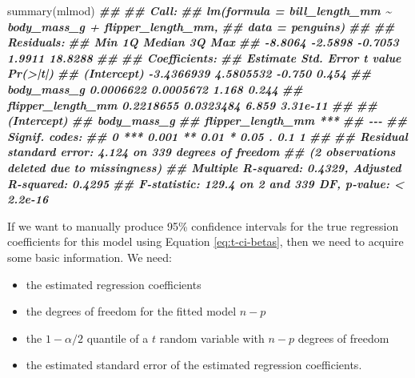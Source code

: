 \documentclass[
]{book}
\newenvironment{Shaded}{\begin{snugshade}}{\end{snugshade}}
\newcommand{\DocumentationTok}[1]{\textcolor[rgb]{0.56,0.35,0.01}{\textbf{\textit{#1}}}}
\newcommand{\FunctionTok}[1]{\textcolor[rgb]{0.00,0.00,0.00}{#1}}
\newcommand{\NormalTok}[1]{#1}
\providecommand{\tightlist}{%
  \setlength{\itemsep}{0pt}\setlength{\parskip}{0pt}}
\theoremstyle{definition}
\theoremstyle{definition}
\theoremstyle{definition}
\theoremstyle{definition}
\theoremstyle{remark}
\begin{document}
\begin{Shaded}
\begin{Highlighting}[]
\FunctionTok{summary}\NormalTok{(mlmod)}
\DocumentationTok{\#\# }
\DocumentationTok{\#\# Call:}
\DocumentationTok{\#\# lm(formula = bill\_length\_mm \textasciitilde{} body\_mass\_g + flipper\_length\_mm, }
\DocumentationTok{\#\#     data = penguins)}
\DocumentationTok{\#\# }
\DocumentationTok{\#\# Residuals:}
\DocumentationTok{\#\#     Min      1Q  Median      3Q     Max }
\DocumentationTok{\#\# {-}8.8064 {-}2.5898 {-}0.7053  1.9911 18.8288 }
\DocumentationTok{\#\# }
\DocumentationTok{\#\# Coefficients:}
\DocumentationTok{\#\#                     Estimate Std. Error t value Pr(\textgreater{}|t|)}
\DocumentationTok{\#\# (Intercept)       {-}3.4366939  4.5805532  {-}0.750    0.454}
\DocumentationTok{\#\# body\_mass\_g        0.0006622  0.0005672   1.168    0.244}
\DocumentationTok{\#\# flipper\_length\_mm  0.2218655  0.0323484   6.859 3.31e{-}11}
\DocumentationTok{\#\#                      }
\DocumentationTok{\#\# (Intercept)          }
\DocumentationTok{\#\# body\_mass\_g          }
\DocumentationTok{\#\# flipper\_length\_mm ***}
\DocumentationTok{\#\# {-}{-}{-}}
\DocumentationTok{\#\# Signif. codes:  }
\DocumentationTok{\#\# 0 \textquotesingle{}***\textquotesingle{} 0.001 \textquotesingle{}**\textquotesingle{} 0.01 \textquotesingle{}*\textquotesingle{} 0.05 \textquotesingle{}.\textquotesingle{} 0.1 \textquotesingle{} \textquotesingle{} 1}
\DocumentationTok{\#\# }
\DocumentationTok{\#\# Residual standard error: 4.124 on 339 degrees of freedom}
\DocumentationTok{\#\#   (2 observations deleted due to missingness)}
\DocumentationTok{\#\# Multiple R{-}squared:  0.4329, Adjusted R{-}squared:  0.4295 }
\DocumentationTok{\#\# F{-}statistic: 129.4 on 2 and 339 DF,  p{-}value: \textless{} 2.2e{-}16}
\end{Highlighting}
\end{Shaded}

If we want to manually produce 95\% confidence intervals for the true regression coefficients for this model using Equation \eqref{eq:t-ci-betas}, then we need to acquire some basic information. We need:

\begin{itemize}
\tightlist
\item
  the estimated regression coefficients
\item
  the degrees of freedom for the fitted model \(n-p\)
\item
  the \(1-\alpha/2\) quantile of a \(t\) random variable with \(n-p\) degrees of freedom
\item
  the estimated standard error of the estimated regression coefficients.
\end{itemize}
\end{document}

